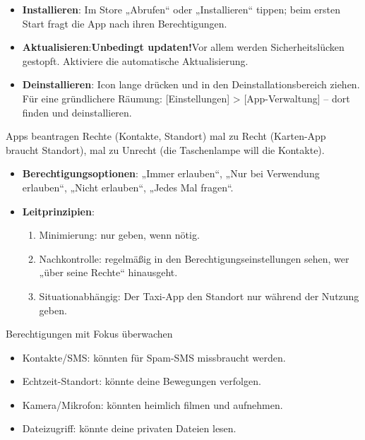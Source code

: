 
\begin{itemize}
  \item \textbf{Installieren}: Im Store „Abrufen“ oder „Installieren“ tippen; beim ersten Start fragt die App nach ihren Berechtigungen.
  \item \textbf{Aktualisieren}:\textbf{Unbedingt updaten!}Vor allem werden Sicherheitslücken gestopft. Aktiviere die automatische Aktualisierung.
  \item \textbf{Deinstallieren}: Icon lange drücken und in den Deinstallationsbereich ziehen. Für eine gründlichere Räumung: [Einstellungen] > [App-Verwaltung] – dort finden und deinstallieren.
\end{itemize}


Apps beantragen Rechte (Kontakte, Standort) mal zu Recht (Karten-App braucht Standort), mal zu Unrecht (die Taschenlampe will die Kontakte).

\begin{itemize}
  \item \textbf{Berechtigungsoptionen}: „Immer erlauben“, „Nur bei Verwendung erlauben“, „Nicht erlauben“, „Jedes Mal fragen“.
  \item \textbf{Leitprinzipien}:
  \begin{enumerate}
    \item Minimierung: nur geben, wenn nötig.
    \item Nachkontrolle: regelmäßig in den Berechtigungseinstellungen sehen, wer „über seine Rechte“ hinausgeht.
    \item Situationabhängig: Der Taxi-App den Standort nur während der Nutzung geben.
  \end{enumerate}
\end{itemize}

\begin{tcbwarn}{Berechtigungen mit Fokus überwachen}
\begin{itemize}
  \item Kontakte/SMS: könnten für Spam-SMS missbraucht werden.
  \item Echtzeit-Standort: könnte deine Bewegungen verfolgen.
  \item Kamera/Mikrofon: könnten heimlich filmen und aufnehmen.
  \item Dateizugriff: könnte deine privaten Dateien lesen.
\end{itemize}

\end{tcbwarn}


